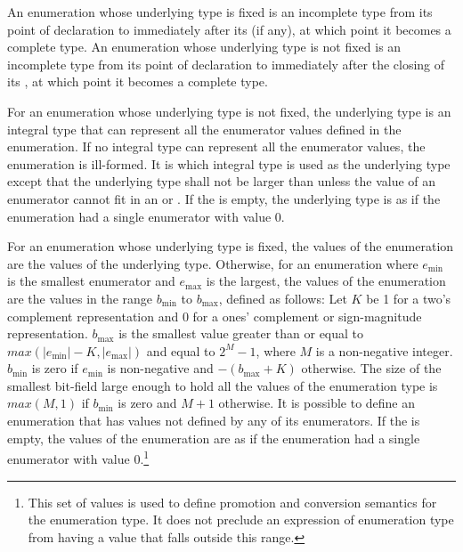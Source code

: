 \pnum
An enumeration whose underlying type is fixed is an incomplete type from its
point of declaration to immediately after its
 (if any), at which point it becomes a complete type.
An enumeration whose underlying type is not fixed is an incomplete type from
its point of declaration to immediately after the closing \tcode{\}} of its
, at which point it becomes a complete type.

\pnum
For an enumeration whose underlying type is not fixed,
the underlying type
is an
integral type that can represent all the enumerator values defined in
the enumeration. If no integral type can represent all the enumerator
values, the enumeration is ill-formed. It is 
which integral type is used as the underlying type
except that the underlying type shall not be larger than 
unless the value of an enumerator cannot fit in an  or
. If the  is empty, the
underlying type is as if the enumeration had a single enumerator with
value 0.

\pnum
{}%
%
%
For an enumeration whose underlying type is fixed, the values of
the enumeration are the values of the underlying type. Otherwise,
for an enumeration where $e_\text{min}$ is the smallest enumerator and
$e_\text{max}$ is the largest, the values of the enumeration are the
values in the range $b_\text{min}$ to $b_\text{max}$, defined as follows: Let $K$
be 1 for a two's complement representation and 0 for a ones' complement
or sign-magnitude representation. $b_\text{max}$ is the smallest value
greater than or equal to $max(|e_\text{min}| - K, |e_\text{max}|)$ and equal to
$2^M-1$, where $M$ is a non-negative integer. $b_\text{min}$ is zero if
$e_\text{min}$ is non-negative and $-(b_\text{max}+K)$ otherwise. The size of the
smallest bit-field large enough to hold all the values of the
enumeration type is $max(M,1)$ if $b_\text{min}$ is zero and $M+1$ otherwise.
It is possible to define an enumeration that has values not defined by
any of its enumerators. If the  is empty, the
values of the enumeration are as if the enumeration had a single enumerator with
value 0.\footnote{This set of values is used to define promotion and
conversion semantics for the enumeration type. It does not preclude an
expression of enumeration type from having a value that falls outside
this range.}

